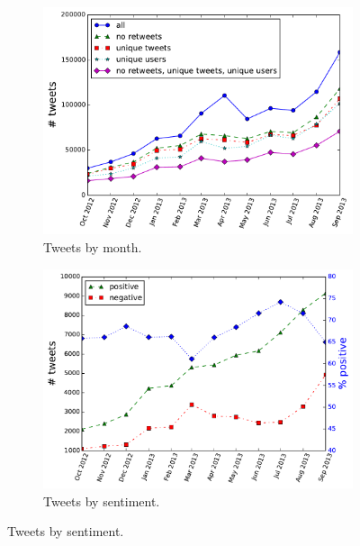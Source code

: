 \documentclass{sig-alternate}
\begin{document}
\begin{figure}[t]
  \caption{Tweets by month and sentiment.}
  \begin{subfigure}{.96\columnwidth}
    \centering
    \caption{Tweets by month. \label{f.total}}
    \includegraphics[width=\columnwidth]{nb/raw_counts.pdf}  %
  \end{subfigure}
  \begin{subfigure}{\columnwidth}
    \centering
    \caption{Tweets by sentiment. \label{f.sentiment}}
    \includegraphics[width=\columnwidth]{nb/sentiment.pdf}
  \end{subfigure}
\end{figure}
\end{document}
